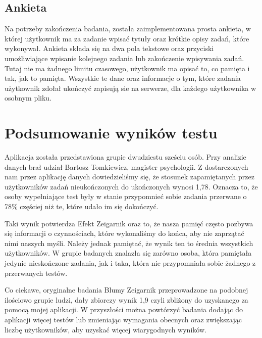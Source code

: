 \documentclass[openright]{xmgr}
\begin{document}
\section{Ankieta}
Na potrzeby zakończenia badania, została zaimplementowana prosta ankieta, w której użytkownik ma za zadanie wpisać tytuły oraz krótkie opisy zadań, które wykonywał. Ankieta składa się na dwa pola tekstowe oraz przyciski umożliwiające wpisanie kolejnego zadania lub zakończenie wpisywania zadań. Tutaj nie ma żadnego limitu czasowego, użytkownik ma opisać to, co pamięta i tak, jak to pamięta. Wszystkie te dane oraz informacje o tym, które zadania użytkownik zdołał ukończyć zapisują sie na serwerze, dla każdego użytkownika w osobnym pliku.

\chapter{Podsumowanie wyników testu}

Aplikacja została przedstawiona grupie dwudziestu sześciu osób. Przy analizie
danych brał udział Bartosz Tomkiewicz, magister psychologii. Z dostarczonych
nam przez aplikację danych dowiedzieliśmy się, że stosunek zapamiętanych przez użytkowników zadań nieukończonych do ukończonych wynosi 1,78. Oznacza to, że
osoby wypełniające test były w stanie przypomnieć sobie zadania przerwane
o 78\% częściej niż te, które udało im się dokończyć.

Taki wynik potwierdza Efekt Zeigarnik oraz to, że nasza pamięć często
pozbywa się informacji o czynnościach, które wykonaliśmy do końca, aby nie
zaprzątać nimi naszych myśli. Należy jednak pamiętać, że wynik ten to
średnia wszystkich użytkowników. W grupie badanych znalazła się zarówno osoba,
która pamiętała jedynie nieskończone zadania, jak i taka, która nie
przypomniała sobie żadnego z przerwanych testów.

Co ciekawe, oryginalne badania Blumy Zeigarnik przeprowadzone na podobnej ilościowo grupie ludzi, dały zbiorczy wynik 1,9 czyli zbliżony do uzyskanego za pomocą mojej aplikacji. W przyszłości można powtórzyć badania dodając do aplikacji więcej testów lub zmieniając wymagania obecnych oraz zwiększając liczbę użytkowników, aby uzyskać więcej wiarygodnych wyników.



\end{document}
